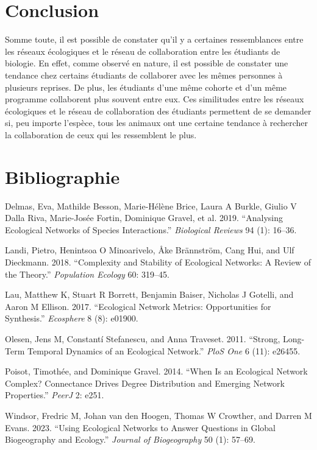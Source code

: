 \documentclass[9pt,twocolumn,twoside,]{pnas-new}
\newlength{\cslhangindent}
\newlength{\cslentryspacingunit} %
\newenvironment{CSLReferences}[2] %
 {%
  \setlength{\parindent}{0pt}
  \ifodd #1
  \let\oldpar\par
  \def\par{\hangindent=\cslhangindent\oldpar}
  \fi
  \setlength{\parskip}{#2\cslentryspacingunit}
 }%
 {}
\begin{document}
\hypertarget{conclusion}{%
\section{Conclusion}\label{conclusion}}

Somme toute, il est possible de constater qu'il y a certaines
ressemblances entre les réseaux écologiques et le réseau de
collaboration entre les étudiants de biologie. En effet, comme observé
en nature, il est possible de constater une tendance chez certains
étudiants de collaborer avec les mêmes personnes à plusieurs reprises.
De plus, les étudiants d'une même cohorte et d'un même programme
collaborent plus souvent entre eux. Ces similitudes entre les réseaux
écologiques et le réseau de collaboration des étudiants permettent de se
demander si, peu importe l'espèce, tous les animaux ont une certaine
tendance à rechercher la collaboration de ceux qui les ressemblent le
plus.

\hypertarget{bibliographie}{%
\section*{Bibliographie}\label{bibliographie}}

\hypertarget{refs}{}
\begin{CSLReferences}{1}{0}
\leavevmode{}%
Delmas, Eva, Mathilde Besson, Marie-Hélène Brice, Laura A Burkle, Giulio
V Dalla Riva, Marie-Josée Fortin, Dominique Gravel, et al. 2019.
{``Analysing Ecological Networks of Species Interactions.''}
\emph{Biological Reviews} 94 (1): 16--36.

\leavevmode{}%
Landi, Pietro, Henintsoa O Minoarivelo, Åke Brännström, Cang Hui, and
Ulf Dieckmann. 2018. {``Complexity and Stability of Ecological Networks:
A Review of the Theory.''} \emph{Population Ecology} 60: 319--45.

\leavevmode{}%
Lau, Matthew K, Stuart R Borrett, Benjamin Baiser, Nicholas J Gotelli,
and Aaron M Ellison. 2017. {``Ecological Network Metrics: Opportunities
for Synthesis.''} \emph{Ecosphere} 8 (8): e01900.

\leavevmode{}%
Olesen, Jens M, Constantí Stefanescu, and Anna Traveset. 2011.
{``Strong, Long-Term Temporal Dynamics of an Ecological Network.''}
\emph{PloS One} 6 (11): e26455.

\leavevmode{}%
Poisot, Timothée, and Dominique Gravel. 2014. {``When Is an Ecological
Network Complex? Connectance Drives Degree Distribution and Emerging
Network Properties.''} \emph{PeerJ} 2: e251.

\leavevmode{}%
Windsor, Fredric M, Johan van den Hoogen, Thomas W Crowther, and Darren
M Evans. 2023. {``Using Ecological Networks to Answer Questions in
Global Biogeography and Ecology.''} \emph{Journal of Biogeography} 50
(1): 57--69.

\end{CSLReferences}



% 
\end{document}
